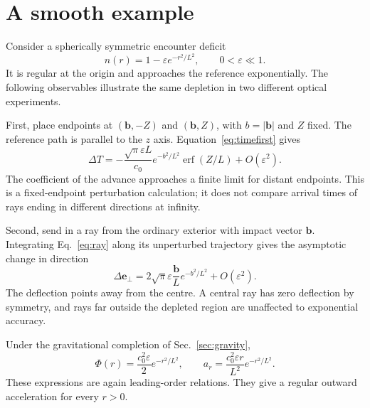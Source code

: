 \documentclass[aps,prd,reprint,nofootinbib]{revtex4-2}
\newcommand{\ve}{\varepsilon}
\begin{document}
\section{A smooth example}
\label{sec:example}

Consider a spherically symmetric encounter deficit
\begin{equation}
 n(r)=1-\ve e^{-r^2/L^2},
 \qquad 0<\ve\ll1.
 \label{eq:gauss}
\end{equation}
It is regular at the origin and approaches the reference exponentially.
The following observables illustrate the same depletion in two
different optical experiments.

First, place endpoints at $(\mathbf b,-Z)$ and $(\mathbf b,Z)$, with
$b=|\mathbf b|$ and $Z$ fixed. The reference path is parallel to the
$z$ axis. Equation~\eqref{eq:timefirst} gives
\begin{equation}
 \Delta T=-\frac{\sqrt{\pi}\ve L}{c_0}
       e^{-b^2/L^2}\operatorname{erf}(Z/L)+O(\ve^2).
 \label{eq:gausstime}
\end{equation}
The coefficient of the advance approaches a finite limit for distant
endpoints. This is a fixed-endpoint perturbation calculation; it does
not compare arrival times of rays ending in different directions at
infinity.

Second, send in a ray from the ordinary exterior with impact vector
$\mathbf b$. Integrating Eq.~\eqref{eq:ray} along its unperturbed
trajectory gives the asymptotic change in direction
\begin{equation}
 \Delta\mathbf e_\perp
  =2\sqrt{\pi}\ve\frac{\mathbf b}{L}
       e^{-b^2/L^2}+O(\ve^2).
 \label{eq:gaussbend}
\end{equation}
The deflection points away from the centre. A central ray has zero
deflection by symmetry, and rays far outside the depleted region are
unaffected to exponential accuracy.

Under the gravitational completion of Sec.~\ref{sec:gravity},
\begin{equation}
 \Phi(r)=\frac{c_0^2\ve}{2}e^{-r^2/L^2},
 \qquad
 a_r=\frac{c_0^2\ve r}{L^2}e^{-r^2/L^2}.
 \label{eq:gaussforce}
\end{equation}
These expressions are again leading-order relations. They give a
regular outward acceleration for every $r>0$.
\end{document}
